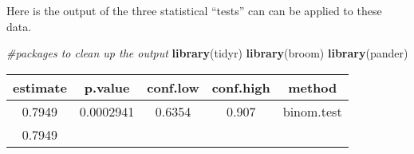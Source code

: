 \documentclass[]{book}
\newenvironment{Shaded}{\begin{snugshade}}{\end{snugshade}}
\newcommand{\KeywordTok}[1]{\textcolor[rgb]{0.13,0.29,0.53}{\textbf{#1}}}
\newcommand{\CommentTok}[1]{\textcolor[rgb]{0.56,0.35,0.01}{\textit{#1}}}
\newcommand{\NormalTok}[1]{#1}
\theoremstyle{definition}
\theoremstyle{definition}
\theoremstyle{definition}
\theoremstyle{remark}
\begin{document}
Here is the output of the three statistical ``tests'' can can be applied
to these data.

\begin{Shaded}
\begin{Highlighting}[]
\CommentTok{#packages to clean up the output}
\KeywordTok{library}\NormalTok{(tidyr)}
\KeywordTok{library}\NormalTok{(broom)}
\KeywordTok{library}\NormalTok{(pander)}
\end{Highlighting}
\end{Shaded}

\begin{longtable}[]{@{}ccccc@{}}
\toprule
\begin{minipage}[b]{0.13\columnwidth}\centering\strut
estimate\strut
\end{minipage} & \begin{minipage}[b]{0.14\columnwidth}\centering\strut
p.value\strut
\end{minipage} & \begin{minipage}[b]{0.13\columnwidth}\centering\strut
conf.low\strut
\end{minipage} & \begin{minipage}[b]{0.14\columnwidth}\centering\strut
conf.high\strut
\end{minipage} & \begin{minipage}[b]{0.14\columnwidth}\centering\strut
method\strut
\end{minipage}\tabularnewline
\midrule
\endhead
\begin{minipage}[t]{0.13\columnwidth}\centering\strut
0.7949\strut
\end{minipage} & \begin{minipage}[t]{0.14\columnwidth}\centering\strut
0.0002941\strut
\end{minipage} & \begin{minipage}[t]{0.13\columnwidth}\centering\strut
0.6354\strut
\end{minipage} & \begin{minipage}[t]{0.14\columnwidth}\centering\strut
0.907\strut
\end{minipage} & \begin{minipage}[t]{0.14\columnwidth}\centering\strut
binom.test\strut
\end{minipage}\tabularnewline
\begin{minipage}[t]{0.13\columnwidth}\centering\strut
0.7949\strut
\end{minipage} & \begin{minipage}[t]{0.14\columnwidth}\centering\strut

\end{minipage}
\end{longtable}
\end{document}
